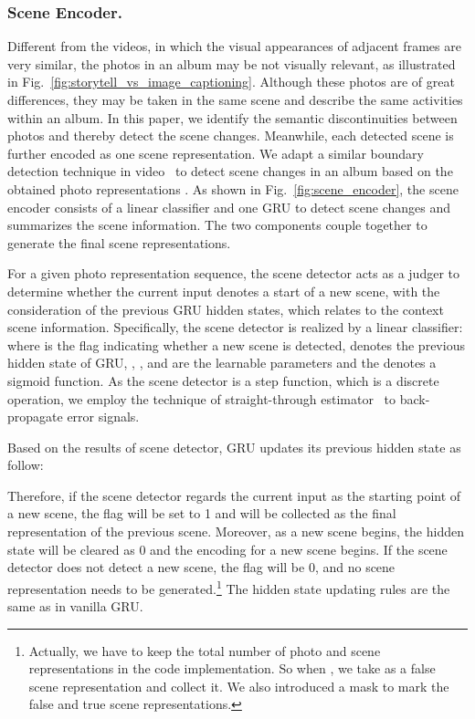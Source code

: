\documentclass[letterpaper]{article} \usepackage{aaai19}  \usepackage{times}  \usepackage{helvet}  \usepackage{courier}  \usepackage{url}  \usepackage{graphicx}  \usepackage{color}
\begin{document}
\subsubsection{Scene Encoder.}
\label{sec:scene_encoder}
Different from the videos, in which the visual appearances of adjacent frames are very similar, the photos in an album may be not visually relevant, as illustrated in Fig.~\ref{fig:storytell_vs_image_captioning}. Although these photos are of great differences, they may be taken in the same scene and describe the same activities within an album. In this paper, we identify the semantic discontinuities between photos and thereby detect the scene changes. Meanwhile, each detected scene is further encoded as one scene representation. We adapt a similar boundary detection technique in video~\cite{baraldi2016hierarchical} to detect scene changes in an album based on the obtained photo representations .
As shown in Fig.~\ref{fig:scene_encoder}, the scene encoder consists of a linear classifier and one GRU to detect scene changes and summarizes the scene information. The two components couple together to generate the final scene representations.  

For a given photo representation sequence, the scene detector acts as a judger to determine whether the current input denotes a start of a new scene, with the consideration of the previous GRU hidden states, which relates to the context scene information. Specifically, the scene detector is realized by a linear classifier: 
where  is the flag indicating whether a new scene is detected,  denotes the previous hidden state of GRU, , , and  are the learnable parameters and the  denotes a sigmoid function. As the scene detector is a step function, which is a discrete operation, we employ the technique of straight-through estimator~\cite{bengio2013estimating} to back-propagate error signals.


Based on the results of scene detector, GRU updates its previous hidden state  as follow:

Therefore, if the scene detector regards the current input  as the starting point of a new scene, the flag  will be set to 1 and  will be collected as the final representation of the previous scene. Moreover, as a new scene begins, the hidden state  will be cleared as 0 and the encoding for a new scene begins. If the scene detector does not detect a new scene,  the flag  will be 0, and no scene representation needs to be generated.\footnote{Actually, we have to keep the total number of photo and scene representations in the code implementation. So when , we take  as a false scene representation and collect it. We also introduced a mask to mark the false and true scene representations.} The hidden state updating rules are the same as in vanilla GRU.
\end{document}
